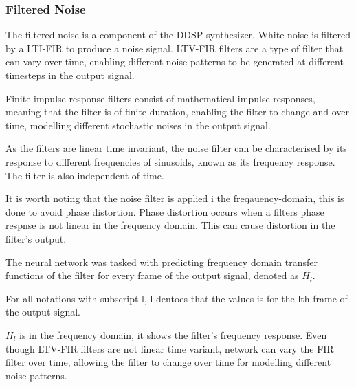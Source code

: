 \vspace{0.5cm}
\vspace{0.5cm}

\subsubsection{Filtered Noise}

The filtered noise is a component of the DDSP synthesizer. White noise is filtered by a \acrfull{LTI-FIR} to produce a noise signal. LTV-FIR filters are a type of filter that can vary over time, enabling different noise patterns to be generated at different timesteps in the output signal.

Finite impulse response filters consist of mathematical impulse responses, meaning that the filter is of finite duration, enabling the filter to change and over time, modelling different stochastic noises in the output signal.

As the filters are linear time invariant, the noise filter can be characterised by its response to different frequencies of sinusoids, known as its frequency response. The filter is also independent of time.

It is worth noting that the noise filter is applied i the freqauency-domain, this is done to avoid phase distortion. Phase distortion occurs when a filters phase respnse is not linear in the frequency domain. This can cause distortion in the filter's output.

The neural network was tasked with predicting frequency domain transfer functions of the filter for every frame of the output signal, denoted as $H_l$\cite{OriginalDDSP}.

For all notations with subscript l, l dentoes that the values is for the lth frame of the output signal.

$H_l$ is in the frequency domain, it shows the filter's frequency response. Even though LTV-FIR filters are not linear time variant, network can vary the FIR filter over time, allowing the filter to change over time for modelling different noise patterns.

